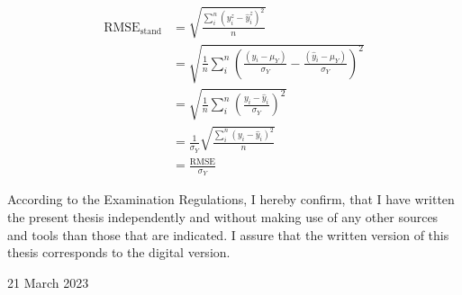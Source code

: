 \documentclass{article}
\begin{document}

\begin{equation}\label{eq:deriv_stand_rmse}
\begin{aligned}
    \text{RMSE}_{\text{stand}} &= \sqrt{\frac{\sum_i^n (y^z_i - \hat{y}^z_i)^2}{n}}\\
    &= \sqrt{\frac{1}{n}\sum_i^n \left(\frac{(y_i - \mu_Y)}{\sigma_Y} - \frac{(\hat{y}_i - \mu_Y)}{\sigma_Y}\right)^2}\\
    &= \sqrt{\frac{1}{n}\sum_i^n \left(\frac{y_i  - \hat{y}_i}{\sigma_Y}\right)^2}\\
    &= \frac{1}{\sigma_Y}\sqrt{\frac{\sum_i^n (y_i  - \hat{y}_i)^2}{n}}\\
    &= \frac{\text{RMSE}}{\sigma_Y}
\end{aligned}
\end{equation}

\clearpage

According to the Examination Regulations, I hereby confirm, that I have written the present thesis independently and without making use of any other sources and
 tools than those that are indicated. I assure that the written version of this thesis corresponds to the digital version.
 
21 March 2023
\end{document}

